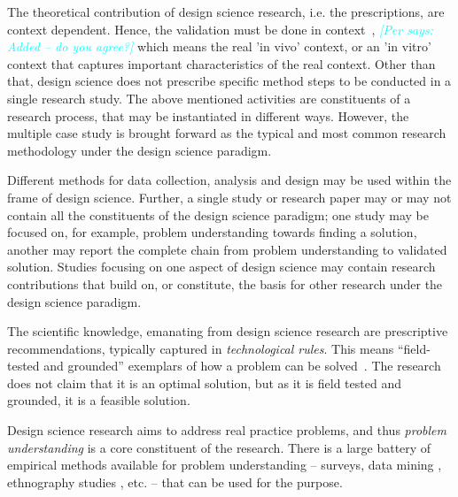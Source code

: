 \documentclass[graybox]{svmult}
\newcommand{\per}[1]{\textcolor{cyan}{{\it [Per says: #1]}}}
\newcommand{\per}[1]{}
\begin{document}
The theoretical contribution of design science research, i.e. the prescriptions, are context dependent. Hence, the validation must be done in context~\cite{wieringa_what_2014}, \per{Added -- do you agree?} which means the real 'in vivo' context, or an 'in vitro' context that captures important characteristics of the real context.  Other than that, design science does not prescribe specific %
method steps to be conducted in a single research study. The above mentioned activities are constituents of  a research process, that may be instantiated in different ways. However, the multiple case study is brought forward as the typical and most common research methodology under the design science paradigm.

Different methods for data collection, analysis and design may be used within the frame of design science. Further, a single study or research paper may or may not contain all the constituents of the design science paradigm; one study may be focused on, for example,  problem understanding towards finding a solution, another may report the complete chain from problem understanding to validated solution. Studies focusing on one aspect of design science may contain research contributions that build on, or constitute, the basis for other research under the design science paradigm.

The scientific knowledge, emanating from design science research are prescriptive recommendations, typically captured in \emph{technological rules}. This means ``field-tested and grounded'' exemplars of how a problem can be solved~\cite{van_aken_management_2004}. The research does not claim that it is an optimal solution, but as it is field tested and grounded, it is a feasible solution.

Design science research aims to address real practice problems, and thus \emph{problem understanding} is a core constituent of the research. There is a large battery of empirical methods available for problem understanding -- surveys, data mining \cite{MenziesDataMining2016}, ethnography studies \cite{SharpEthnography2016}, etc. -- that can be used for the purpose. 
\end{document}
